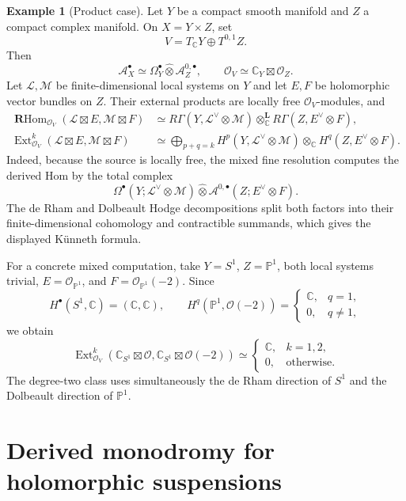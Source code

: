 \documentclass[12pt]{amsart}
\theoremstyle{definition}
\newtheorem{example}[thm]{Example}
\theoremstyle{remark}
\numberwithin{equation}{section}
\newcommand{\CA}{\mathcal A}
\newcommand{\CO}{\mathcal O}
\newcommand{\C}{\mathbb C}
\newcommand{\rhom}{\operatorname{\mathbf{R}Hom}}
\newcommand{\ext}{\operatorname{Ext}}
\begin{document}
\begin{example}[Product case]
Let \(Y\) be a compact smooth manifold and \(Z\) a compact complex manifold.
On \(X=Y\times Z\), set
\[
V=T_{\C}Y\oplus T^{0,1}Z.
\]
Then
\[
\CA_X^\bullet
\simeq
\Omega^\bullet_Y\widehat\otimes\CA_Z^{0,\bullet},
\qquad
\CO_V\simeq\C_Y\boxtimes\CO_Z.
\]
Let \(\mathcal L,\mathcal M\) be finite-dimensional local systems on \(Y\)
and let \(E,F\) be holomorphic vector bundles on \(Z\).  Their external
products are locally free \(\CO_V\)-modules, and
\begin{align*}
\rhom_{\CO_V}(\mathcal L\boxtimes E,\mathcal M\boxtimes F)
&\simeq
R\Gamma(Y,\mathcal L^\vee\otimes\mathcal M)
\otimes_{\C}^{\mathbf L}
R\Gamma(Z,E^\vee\otimes F),\\
\ext^k_{\CO_V}(\mathcal L\boxtimes E,\mathcal M\boxtimes F)
&\simeq
\bigoplus_{p+q=k}
H^p(Y,\mathcal L^\vee\otimes\mathcal M)
\otimes_{\C}H^q(Z,E^\vee\otimes F).
\end{align*}
Indeed, because the source is locally free, the mixed fine resolution
computes the derived Hom by the total complex
\[
\Omega^\bullet(Y;\mathcal L^\vee\otimes\mathcal M)
\widehat\otimes
\CA^{0,\bullet}(Z;E^\vee\otimes F).
\]
The de Rham and Dolbeault Hodge decompositions split both factors into their
finite-dimensional cohomology and contractible summands, which gives the
displayed K\"unneth formula.

For a concrete mixed computation, take \(Y=S^1\), \(Z=\mathbb P^1\), both
local systems trivial, \(E=\CO_{\mathbb P^1}\), and
\(F=\CO_{\mathbb P^1}(-2)\).  Since
\[
H^\bullet(S^1,\C)=(\C,\C),
\qquad
H^q(\mathbb P^1,\CO(-2))=
\begin{cases}
\C,&q=1,\\
0,&q\ne1,
\end{cases}
\]
we obtain
\[
\ext^k_{\CO_V}
(\C_{S^1}\boxtimes\CO,\C_{S^1}\boxtimes\CO(-2))
\simeq
\begin{cases}
\C,&k=1,2,\\
0,&\text{otherwise}.
\end{cases}
\]
The degree-two class uses simultaneously the de Rham direction of \(S^1\)
and the Dolbeault direction of \(\mathbb P^1\).
\end{example}

\section{Derived monodromy for holomorphic suspensions}
\label{sec:derived-suspensions}
\end{document}

